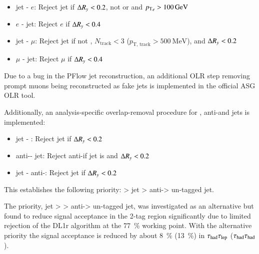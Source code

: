 \begin{itemize}
\item jet - $e$: Reject jet if $\Delta R_y < 0.2$, not \btagged or \btagged and
  ${\pT}_{e} > \SI{100}{\GeV}$
\item $e$ - jet: Reject $e$ if $\Delta R_y < 0.4$

\item jet - $\mu$: Reject jet if not \btagged, $N_\text{track} < 3$ ($p_\text{T,
  track} > \SI{500}{\MeV}$), and $\Delta R_y < 0.2$
\item $\mu$ - jet: Reject $\mu$ if $\Delta R_y < 0.4$
\end{itemize}
Due to a bug in the PFlow jet reconstruction, an additional OLR step removing
prompt muons being reconstructed as fake jets is implemented in the official ASG
OLR tool.

Additionally, an analysis-specific overlap-removal procedure for \tauhadvis,
anti-\tauhadvis and jets is implemented:
\begin{itemize}
\item jet - \tauhadvis: Reject jet if $\Delta R_y < 0.2$
\item anti-\tauhadvis - jet: Reject anti-\tauhad if jet is \btagged and $\Delta R_y <
  0.2$
\item jet - anti-\tauhadvis: Reject jet  if $\Delta R_y < 0.2$
\end{itemize}
This establishes the following priority: \tauhadvis > \btagged jet >
anti-\tauhadvis > un-tagged jet.

The priority, \btagged jet > \tauhadvis > anti-\tauhadvis > un-tagged jet, was
investigated as an alternative but found to reduce signal acceptance in the
2-tag region significantly due to limited \tauhad rejection of the DL1r \btag
algorithm at the \SI{77}{\percent} working point. With the alternative priority
the signal acceptance is reduced by about \SI{8}{\percent} (\SI{13}{\percent})
in $\tau_{\text{had}}\tau_{\text{lep}}$ ($\tau_{\text{had}}\tau_{\text{had}}$).







